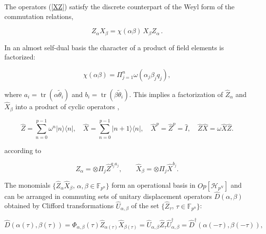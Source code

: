 \documentclass[quantumrep,article,submit,pdftex,moreauthors]{Definitions/mdpi}
\DeclareMathOperator{\tr}{tr}
\begin{document}
The operators (\ref{XZ}) satisfy the discrete counterpart of the Weyl form
of the commutation relations, 

\begin{equation}
Z_{\alpha }X_{\beta }=\chi \left( \alpha \beta \right) \,X_{\beta }Z_{\alpha
}\,.  \label{commutation_relation}
\end{equation}

In an almost self-dual basis the character of a product of field elements is
factorized:

\begin{equation}
  \chi \left( \alpha \beta \right)
  = \Pi _{j=1}^{n}\omega \left( \alpha_{j}\beta _{j}q_{j}\right), 
  \label{chi fact}
\end{equation}

where $a_{i} = \tr(\alpha \tilde{\theta}_{i})$ and $b_{i} = \tr(\beta
\tilde{\theta }_{i})$. This implies a factorization of $\hat{Z}_{\alpha}$ and
$\hat{X}_{\beta }$ into a product of cyclic operators
\cite{Schwinger1,Schwinger2}, 

\begin{equation}
  \hat{Z} = \sum_{n=0}^{p-1}\omega ^{n}|n\rangle \langle n|,
  \quad \hat{X} = \sum_{n=0}^{p-1}|n+1\rangle \langle n|,
  \quad \hat{X}^{p} = \hat{Z}^{p} = \hat{I},
  \quad \hat{Z}\hat{X} = \omega \hat{X}\hat{Z}.
\end{equation}

according to 

\begin{equation}
  \hat{Z}_{\alpha } = \otimes \Pi _{j}\hat{Z}^{q_{j}a_{j}},
  \qquad \hat{X}_{\beta} = \otimes \Pi _{j}\hat{X}^{b_{j}}. 
  \label{ZXq}
\end{equation}

The monomials $\{\hat{Z}_{\alpha }\hat{X}_{\beta }$, $\alpha ,\beta \in
\mathbb{F}_{p^{n}}\}$ form an operational basis in $Op[\mathcal{H}_{p^{N}}]$ and
can be arranged in commuting sets of unitary displacement operators $
\hat{D}(\alpha,\beta)$ obtained by Clifford transformations
$\hat{U}_{\alpha,\beta}$ of the set $\{\hat{Z}_{\tau}$, $\tau \in \mathbb{F}
_{p^{n}}\}$:

\begin{equation}
  \hat{D}\left( \alpha (\tau ),\beta (\tau )\right)
  = \Phi_{\alpha,\beta}\left( \tau \right)
  \hat{Z}_{\alpha (\tau )}\hat{X}_{\beta (\tau )}
  = \hat{U}_{\alpha,\beta }\hat{Z}_{\tau }\hat{U}_{\alpha,\beta }^{\dagger }
  =\hat{D}^{\dagger }\left( \alpha (-\tau ),\beta (-\tau )\right), 
  \label{D}
\end{equation}
\end{document}
